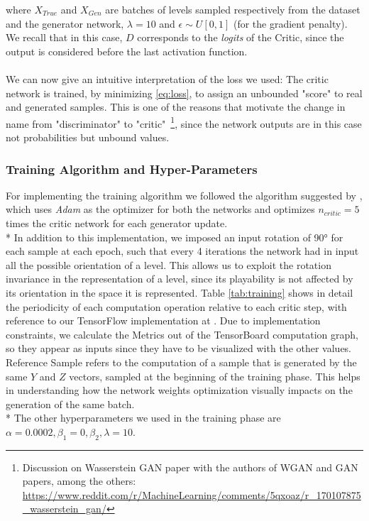 where $X_{True}$ and $X_{Gen}$ are batches of levels sampled respectively from the dataset and the generator network, $\lambda = 10$ and $ \epsilon \sim U[0,1] $ (for the gradient penalty). We recall that in this case, $D$ corresponds to the \textit{logits} of the Critic, since the output is considered before the last activation function.

\paragraph{} We can now give an intuitive interpretation of the loss we used: The critic network is trained, by minimizing \ref{eq:loss}, to assign an unbounded "score" to real and generated samples. This is one of the reasons that motivate the change in name from "discriminator" to "critic"~\footnote{ Discussion on Wasserstein GAN paper with the authors of WGAN and GAN papers, among the others: \url{https://www.reddit.com/r/MachineLearning/comments/5qxoaz/r_170107875_wasserstein_gan/}}, since the network outputs are in this case not probabilities but unbound values.

\subsubsection{Training Algorithm and Hyper-Parameters}
For implementing the training algorithm we followed the algorithm suggested by \cite[alg.~1. p.~4]{wgangp}, which uses \textit{Adam}\cite{adam} as the optimizer for both the networks and optimizes $n_{critic} = 5$ times the critic network for each generator update. \\*
In addition to this implementation, we imposed an input rotation of 90° for each sample at each epoch, such that every 4 iterations the network had in input all the possible orientation of a level. This allows us to exploit the rotation invariance in the representation of a level, since its playability is not affected by its orientation in the space it is represented. Table \ref{tab:training} shows in detail the periodicity of each computation operation relative to each critic step, with reference to our TensorFlow implementation at \cite{gitrepo}. Due to implementation constraints, we calculate the Metrics out of the TensorBoard computation graph, so they appear as inputs since they have to be visualized with the other values. Reference Sample refers to the computation of a sample that is generated by the same $Y$ and $Z$ vectors, sampled at the beginning of the training phase. This helps in understanding how the network weights optimization visually impacts on the generation of the same batch. \\*
The other hyperparameters we used in the training phase are $\alpha=0.0002, \beta_1=0, \beta_2, \lambda=10$.

